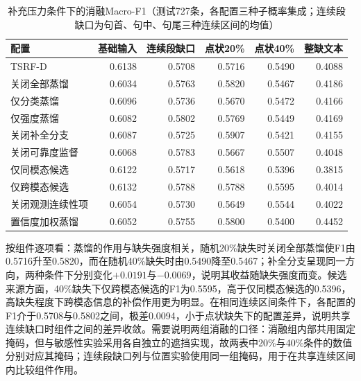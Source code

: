 \begin{table}[htbp]\centering\small
\setlength{\tabcolsep}{4pt}
\caption{补充压力条件下的消融Macro-F1（测试727条，各配置三种子概率集成；连续段缺口为句首、句中、句尾三种连续区间的均值）}\label{q2:tab:ablstress}
\begin{tabular}{lrrrrr}
\toprule
配置 & 基础输入 & 连续段缺口 & 点状20\% & 点状40\% & 整缺文本 \\
\midrule
TSRF-D & 0.6138 & 0.5708 & 0.5716 & 0.5490 & 0.4088 \\
关闭全部蒸馏 & 0.6034 & 0.5763 & 0.5820 & 0.5467 & 0.4186 \\
仅分类蒸馏 & 0.6096 & 0.5736 & 0.5670 & 0.5472 & 0.4166 \\
仅强度蒸馏 & 0.6082 & 0.5802 & 0.5769 & 0.5449 & 0.4169 \\
关闭补全分支 & 0.6087 & 0.5725 & 0.5907 & 0.5421 & 0.4155 \\
关闭可靠度监督 & 0.6068 & 0.5783 & 0.5667 & 0.5507 & 0.4048 \\
仅同模态候选 & 0.6122 & 0.5717 & 0.5618 & 0.5396 & 0.3815 \\
仅跨模态候选 & 0.6132 & 0.5788 & 0.5788 & 0.5595 & 0.4014 \\
关闭观测连续性项 & 0.6054 & 0.5730 & 0.5649 & 0.5544 & 0.4022 \\
置信度加权蒸馏 & 0.6052 & 0.5755 & 0.5800 & 0.5400 & 0.4452 \\
\bottomrule
\end{tabular}
\end{table}
按组件逐项看：蒸馏的作用与缺失强度相关，随机20\%缺失时关闭全部蒸馏使F1由0.5716升至0.5820，而在随机40\%缺失时由0.5490降至0.5467；补全分支呈现同一方向，两种条件下分别变化$+0.0191$与$-0.0069$，说明其收益随缺失强度而变。候选来源方面，40\%缺失下仅跨模态候选的F1为0.5595，高于仅同模态候选的0.5396，高缺失程度下跨模态信息的补偿作用更为明显。在相同连续区间条件下，各配置的F1介于0.5708与0.5802之间，极差0.0094，小于点状缺失下的配置差异，说明共享连续缺口时组件之间的差异收敛。需要说明两组消融的口径：消融组内部共用固定掩码，但与敏感性实验采用各自独立的遮挡实现，故两表中20\%与40\%条件的数值分别对应其掩码；连续段缺口列与位置实验使用同一组掩码，用于在共享连续区间内比较组件作用。

